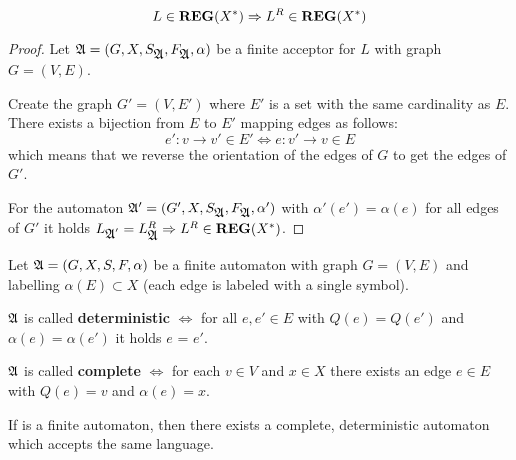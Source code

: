 \bigskip
\begin{theorem}
\[ L \in \mbox{{\bf REG}}(X^*) \Rightarrow L^R \in \mbox{{\bf REG}}(X^*) \]
\end{theorem}

\begin{proof}
Let $\mbox{$\mathfrak{A}$} = (G, X, S_{\mbox{$\mathfrak{A}$}}, F_{\mbox{$\mathfrak{A}$}}, \alpha)$ be a
finite acceptor for $L$ with graph $G = (V, E)$.

Create the graph $G' = (V, E')$ where $E'$ is a set with the same cardinality
as $E$. There exists a bijection from $E$ to $E'$ mapping edges as follows:
\[ e' : v \to v' \in E' \Leftrightarrow e : v' \to v \in E \]
which means that we reverse the orientation of the edges of $G$ to get the
edges of $G'$.

For the automaton $\mbox{$\mathfrak{A'}$} = (G', X, S_{\mbox{$\mathfrak{A}$}}, F_{\mbox{$\mathfrak{A}$}}, \alpha')$ with
$\alpha'(e') = \alpha(e)$ for all edges of $G'$ it holds $L_{\mbox{$\mathfrak{A}$}'} = 
L_{\mbox{$\mathfrak{A}$}}^R \Rightarrow L^R \in \mbox{{\bf REG}}(X^*)$.
\end{proof}

\bigskip
\begin{definition}
Let $\mbox{$\mathfrak{A}$} = (G, X, S, F, \alpha)$ be a finite automaton with graph $G=(V, E)$
and labelling $\alpha(E) \subset X$ (each edge is labeled with a single
symbol).

$\mbox{$\mathfrak{A}$}$ is called {\bf deterministic} $\iff$ for all $e, e' \in E$ with
$Q(e) = Q(e')$ and $\alpha(e) = \alpha(e')$ it holds $e$ = $e'$.

$\mbox{$\mathfrak{A}$}$ is called {\bf complete} $\iff$ for each $v \in V$ and $x \in X$ there
exists an edge $e \in E$ with $Q(e) = v$ and $\alpha(e) = x$.
\end{definition}

\bigskip
\begin{theorem}
If  is a finite automaton, then there exists a complete, deterministic
automaton  which accepts the same language.
\end{theorem}

